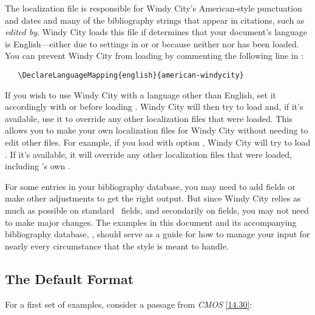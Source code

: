 \documentclass[11pt,letterpaper,oneside]{article}
\begin{document}
The localization file  is responsible for
Windy City's American-style punctuation and dates and many of the
bibliography strings that appear in citations, such as \textit{edited
by}. Windy City loads this file if \biblatex determines that your
document's language is English---either due to settings in 
or  or because neither  nor
 has been loaded. You can prevent Windy City from
loading  by commenting the following line
in :

\begin{verbatim}
   \DeclareLanguageMapping{english}{american-windycity}
\end{verbatim}

If you wish to use Windy City with a language other than English, set
it accordingly with  or  before loading
\biblatex. Windy City will then try to load
 and, if it's available, use it to
override any other localization files that were loaded. This allows
you to make your own localization files for Windy City without needing
to edit other files. For example, if you load  with option
, Windy City will try to load .
If it's available, it will override any other localization files that
were loaded, including \biblatex's own .

For some entries in your bibliography database, you may need to add
fields or make other adjustments to get the right output. But since
Windy City relies as much as possible on standard \BibTeX\ fields, and
secondarily on \biblatex fields, you may not need to make major
changes. The examples in this document and its accompanying
bibliography database, , should serve as a guide
for how to manage your input for nearly every circumstance that the
style is meant to handle.

\subsection{The Default Format}
\label{default}

For a first set of examples, consider a passage from \textit{CMOS}
\ref{14.30}:

\begin{citeonly}
\item \cite[24--25]{morley1995}
\item \cite{schwartz1992}
\item \cite{kaiser1964}
\item \cite[43]{morley1995}
\item \cite[138]{schwartz1992}
\item \cite[189--90]{kaiser1964}
\end{citeonly}
\end{document}
